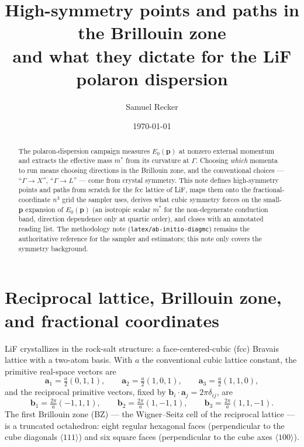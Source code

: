 \documentclass[11pt]{article}
\title{High-symmetry points and paths in the Brillouin zone\\
       \large and what they dictate for the LiF polaron dispersion}
\author{Samuel Recker}
\date{\today}
\newcommand{\pv}{\mathbf{p}}
\newcommand{\av}{\mathbf{a}}
\newcommand{\bv}{\mathbf{b}}
\begin{document}
\maketitle

\begin{abstract}
The polaron-dispersion campaign measures $E_{0}(\pv)$ at nonzero external momentum and
extracts the effective mass $m^{*}$ from its curvature at $\Gamma$. Choosing \emph{which}
momenta to run means choosing directions in the Brillouin zone, and the conventional
choices --- ``$\Gamma\!\to\!X$'', ``$\Gamma\!\to\!L$'' --- come from crystal symmetry.
This note defines high-symmetry points and paths from scratch for the fcc lattice of
LiF, maps them onto the fractional-coordinate $n^{3}$ grid the sampler uses, derives what
cubic symmetry forces on the small-$\pv$ expansion of $E_{0}(\pv)$ (an isotropic scalar
$m^{*}$ for the non-degenerate conduction band, direction dependence only at quartic
order), and closes with an annotated reading list. The methodology note
(\texttt{latex/ab-initio-diagmc}) remains the authoritative reference for the sampler and
estimators; this note only covers the symmetry background.
\end{abstract}

\section{Reciprocal lattice, Brillouin zone, and fractional coordinates}
\label{sec:bz}

LiF crystallizes in the rock-salt structure: a face-centered-cubic (fcc) Bravais lattice
with a two-atom basis. With $a$ the conventional cubic lattice constant, the primitive
real-space vectors are
\begin{equation}
\av_{1}=\tfrac{a}{2}(0,1,1),\qquad
\av_{2}=\tfrac{a}{2}(1,0,1),\qquad
\av_{3}=\tfrac{a}{2}(1,1,0),
\end{equation}
and the reciprocal primitive vectors, fixed by $\bv_{i}\cdot\av_{j}=2\pi\delta_{ij}$, are
\begin{equation}
\bv_{1}=\tfrac{2\pi}{a}(-1,1,1),\qquad
\bv_{2}=\tfrac{2\pi}{a}(1,-1,1),\qquad
\bv_{3}=\tfrac{2\pi}{a}(1,1,-1).
\label{eq:recip}
\end{equation}
The first Brillouin zone (BZ) --- the Wigner--Seitz cell of the reciprocal lattice --- is
a truncated octahedron: eight regular hexagonal faces (perpendicular to the cube
diagonals $\langle111\rangle$) and six square faces (perpendicular to the cube axes
$\langle100\rangle$).
\end{document}
